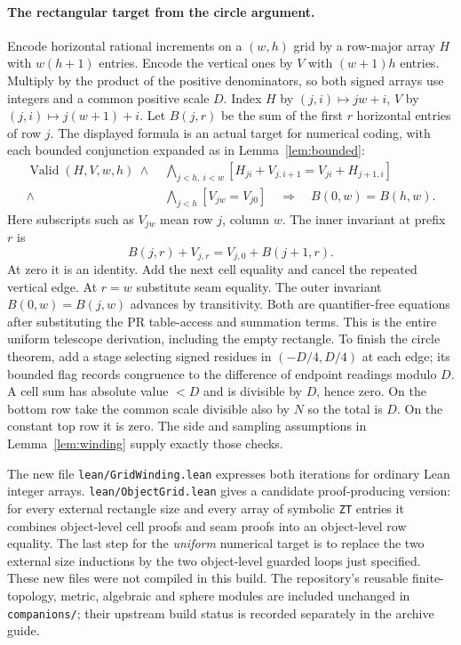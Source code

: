 \paragraph{The rectangular target from the circle argument.}
Encode horizontal rational increments on a $(w,h)$ grid by a row-major array $H$ with $w(h+1)$ entries. Encode the vertical ones by $V$ with $(w+1)h$ entries. Multiply by the product of the positive denominators, so both signed arrays use integers and a common positive scale $D$. Index $H$ by $(j,i)\mapsto jw+i$, $V$ by $(j,i)\mapsto j(w+1)+i$. Let $B(j,r)$ be the sum of the first $r$ horizontal entries of row $j$. The displayed formula is an actual target for numerical coding, with each bounded conjunction expanded as in Lemma~\ref{lem:bounded}:
\[
\begin{split}
 \operatorname{Valid}(H,V,w,h)\ \land\;
 &\bigwedge_{j<h,\ i<w}
 [H_{ji}+V_{j,i+1}=V_{ji}+H_{j+1,i}]\\[-2pt]
 {}\land\;&\bigwedge_{j<h}[V_{jw}=V_{j0}]
       \quad\Longrightarrow\quad B(0,w)=B(h,w).
\end{split}
\]
Here subscripts such as $V_{jw}$ mean row $j$, column $w$. The inner invariant at prefix $r$ is
\[
 B(j,r)+V_{j,r}=V_{j,0}+B(j+1,r).
\]
At zero it is an identity. Add the next cell equality and cancel the repeated vertical edge. At $r=w$ substitute seam equality. The outer invariant $B(0,w)=B(j,w)$ advances by transitivity. Both are quantifier-free equations after substituting the PR table-access and summation terms. This is the entire uniform telescope derivation, including the empty rectangle. To finish the circle theorem, add a stage selecting signed residues in $(-D/4,D/4)$ at each edge; its bounded flag records congruence to the difference of endpoint readings modulo $D$. A cell sum has absolute value $<D$ and is divisible by $D$, hence zero. On the bottom row take the common scale divisible also by $N$ so the total is $D$. On the constant top row it is zero. The side and sampling assumptions in Lemma~\ref{lem:winding} supply exactly those checks.

The new file \texttt{lean/GridWinding.lean} expresses both iterations for ordinary Lean integer arrays. \texttt{lean/ObjectGrid.lean} gives a candidate proof-producing version: for every external rectangle size and every array of symbolic \texttt{ZT} entries it combines object-level cell proofs and seam proofs into an object-level row equality. The last step for the \emph{uniform} numerical target is to replace the two external size inductions by the two object-level guarded loops just specified. These new files were not compiled in this build. The repository's reusable finite-topology, metric, algebraic and sphere modules are included unchanged in \texttt{companions/}; their upstream build status is recorded separately in the archive guide.

